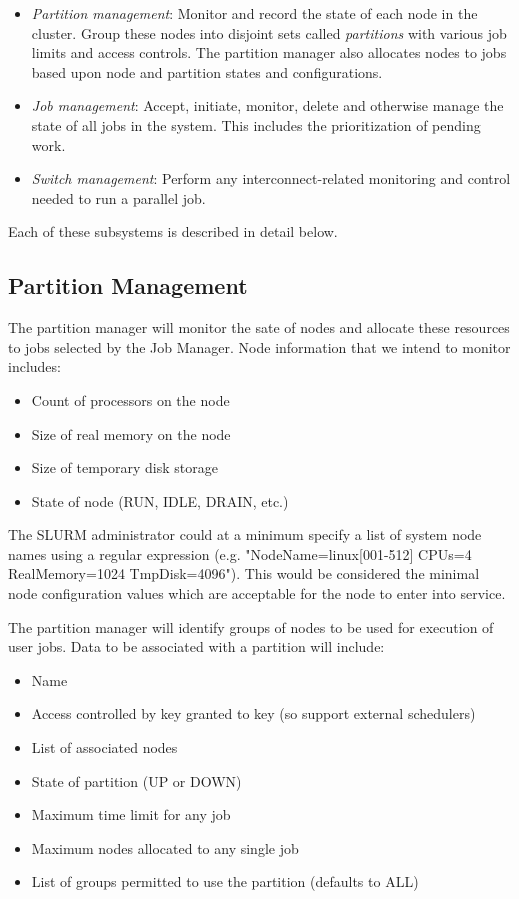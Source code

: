 \begin{itemize}
\item {\em Partition management}: Monitor and record the state of each 
node in the cluster.
Group these nodes into disjoint sets called {\em partitions} with various 
job limits and access controls.
The partition manager also allocates nodes to jobs based upon 
node and partition states and configurations. 

\item {\em Job management}: Accept, initiate, monitor, delete and otherwise 
manage the state of all jobs in the system. This includes the prioritization 
of pending work.

\item {\em Switch management}: Perform any interconnect-related 
monitoring and control needed to run a parallel job.

\end{itemize}

Each of these subsystems is described in detail below.

\subsection{Partition Management}

The partition manager will monitor the sate of nodes and allocate 
these resources to jobs selected by the Job Manager. 
Node information that we intend to monitor includes:

\begin{itemize}
\item Count of processors on the node
\item Size of real memory on the node
\item Size of temporary disk storage
\item State of node (RUN, IDLE, DRAIN, etc.)
\end{itemize}

The SLURM administrator could at a minimum specify a list of system node 
names using a regular expression (e.g. "NodeName=linux[001-512] CPUs=4 
RealMemory=1024 TmpDisk=4096"). 
This would be considered the minimal node configuration values which are 
acceptable for the node to enter into service.

The partition manager will identify groups of nodes to be used for
execution of user jobs. Data to be associated with a partition will include:
\begin{itemize}
\item Name
\item Access controlled by key granted to key (so support external schedulers)
\item List of associated nodes
\item State of partition (UP or DOWN)
\item Maximum time limit for any job
\item Maximum nodes allocated to any single job
\item List of groups permitted to use the partition (defaults to ALL)
\end{itemize}

